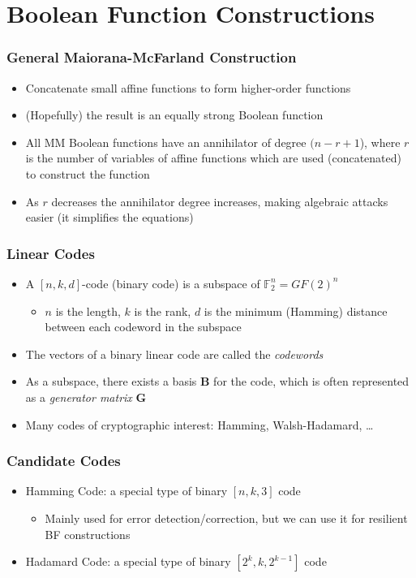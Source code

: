 \documentclass[handout]{beamer}
\begin{document}
\section{Boolean Function Constructions}
\begin{frame}
	\frametitle{General Maiorana-McFarland Construction}
	\begin{itemize}
		\item Concatenate small affine functions to form higher-order functions
		\item (Hopefully) the result is an equally strong Boolean function
		\item All MM Boolean functions have an annihilator of degree $(n - r + 1$), where $r$ is the number of variables of affine functions
		which are used (concatenated) to construct the function
		\item As $r$ decreases the annihilator degree increases, making algebraic attacks easier (it simplifies the equations)
	\end{itemize}
\end{frame}

\begin{frame}
	\frametitle{Linear Codes}
	\begin{itemize}
		\item A $[n,k,d]$-code (binary code) is a subspace of $\mathbb{F}_2^n = GF(2)^n$ 
		\begin{itemize}
			\item $n$ is the length, $k$ is the rank, $d$ is the minimum (Hamming) distance between each codeword in the subspace
		\end{itemize}
		\item The vectors of a binary linear code are called the \emph{codewords}
		\item As a subspace, there exists a basis $\mathbf{B}$ for the code, which is often represented as a \emph{generator matrix} $\mathbf{G}$
		\item Many codes of cryptographic interest: Hamming, Walsh-Hadamard, \dots
	\end{itemize}
\end{frame}

\begin{frame}
	\frametitle{Candidate Codes}
	\begin{itemize}
		\item Hamming Code: a special type of binary $[n,k,3]$ code
		\begin{itemize}
			\item Mainly used for error detection/correction, but we can use it for resilient BF constructions
		\end{itemize}
		\item Hadamard Code: a special type of binary $[2^k, k, 2^{k-1}]$ code
	\end{itemize}
\end{frame}
\end{document}
